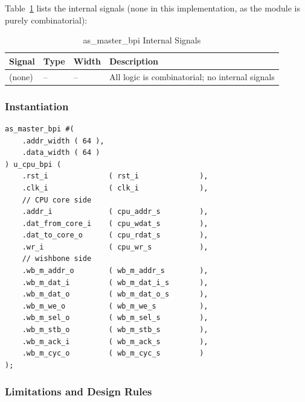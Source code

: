 Table~\ref{tab:asMasterBpiInt} lists the internal signals (none in this
implementation, as the module is purely combinatorial):

\begin{table}[H]
\caption{as\_master\_bpi Internal Signals}
\label{tab:asMasterBpiInt}
\centering
\begin{tabularx}{\textwidth}{|l |l |l |X|}
  \hline
  Signal & Type & Width & Description \\
  \hline
  \hline
  (none) & -- & -- & All logic is combinatorial; no internal signals \\
  \hline
\end{tabularx}
\end{table}

\subsubsection{Instantiation}

\begin{verbatim}
as_master_bpi #(
    .addr_width ( 64 ),
    .data_width ( 64 )
) u_cpu_bpi (
    .rst_i              ( rst_i              ),
    .clk_i              ( clk_i              ),
    // CPU core side
    .addr_i             ( cpu_addr_s         ),
    .dat_from_core_i    ( cpu_wdat_s         ),
    .dat_to_core_o      ( cpu_rdat_s         ),
    .wr_i               ( cpu_wr_s           ),
    // wishbone side
    .wb_m_addr_o        ( wb_m_addr_s        ),
    .wb_m_dat_i         ( wb_m_dat_i_s       ),
    .wb_m_dat_o         ( wb_m_dat_o_s       ),
    .wb_m_we_o          ( wb_m_we_s          ),
    .wb_m_sel_o         ( wb_m_sel_s         ),
    .wb_m_stb_o         ( wb_m_stb_s         ),
    .wb_m_ack_i         ( wb_m_ack_s         ),
    .wb_m_cyc_o         ( wb_m_cyc_s         )
);
\end{verbatim}

\subsubsection{Limitations and Design Rules}

